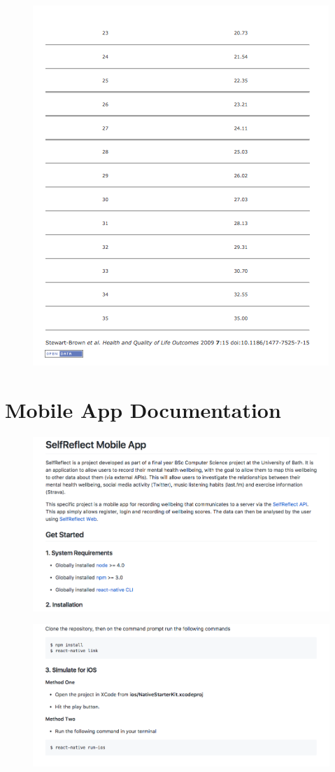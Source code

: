 \documentclass[11pt,openright,a4paper]{report}
\begin{document}
\begin{appendices}
\newpage
\begin{figure}[ht]
  \centering
  \includegraphics[width =.7\textwidth]{i/swemwbsconversiontable2.png}
\end{figure}

\newpage
\section{Mobile App Documentation} \label{app:mobiledocs}
\begin{figure}[ht]
  \centering
  \includegraphics[width=.9\textwidth]{i/mobiledocs1.png}
\end{figure}

\begin{figure}[ht]
  \centering
  \includegraphics[width=.9\textwidth]{i/mobiledocs2.png}
\end{figure}


\end{appendices}
\end{document}
